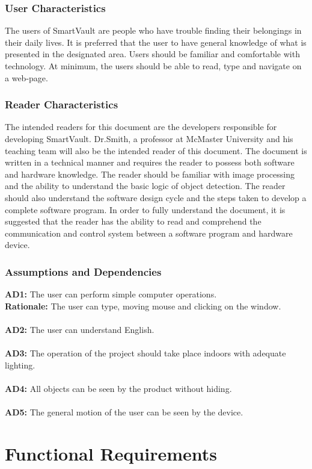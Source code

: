 \documentclass[12pt]{article}
\begin{document}
\subsubsection{User Characteristics}
The users of SmartVault are people who have trouble finding their belongings in their daily lives. It is preferred that the user to have general knowledge of what is presented in the designated area. Users should be familiar and comfortable with technology. At minimum, the users should be able to read, type and navigate on a web-page. 
\subsubsection{Reader Characteristics}
The intended readers for this document are the developers responsible for developing SmartVault. Dr.Smith, a professor at McMaster University and his teaching team will also be the intended reader of this document. The document is written in a technical manner and requires the reader to possess both software and hardware knowledge. The reader should be familiar with image processing and the ability to understand the basic logic of object detection. The reader should also understand the software design cycle and the steps taken to develop a complete software program. In order to fully understand the document, it is suggested that the reader has the ability to read and comprehend the communication and control system between a software program and hardware device. 
\subsubsection{Assumptions and Dependencies}
\textbf{AD1:} The user can perform simple computer operations.\\
\textbf{Rationale:} The user can type, moving mouse and clicking on the window.\\\\
\textbf{AD2:} The user can understand English.\\\\
\textbf{AD3:} The operation of the project should take place indoors with adequate lighting.\\\\
\textbf{AD4:} All objects can be seen by the product without hiding.\\\\
\textbf{AD5:} The general motion of the user can be seen by the device. 
\section{Functional Requirements}
\end{document}
